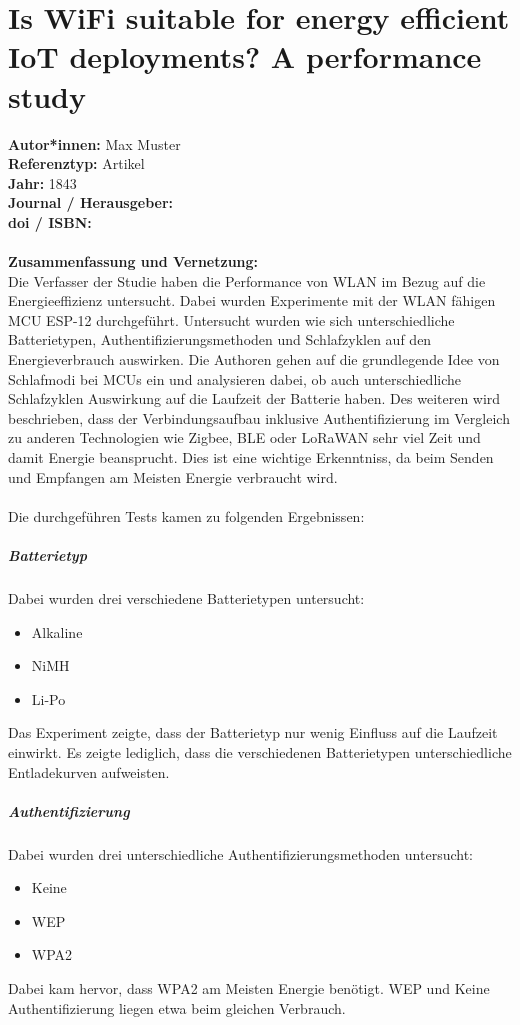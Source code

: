 \documentclass{report}
\begin{document}
{\let\clearpage\relax \chapter{Is WiFi suitable for energy efficient IoT deployments? A performance study}}
\noindent
\textbf{Autor*innen:} Max Muster\\
\textbf{Referenztyp:} Artikel\\
\textbf{Jahr:} 1843\\
\textbf{Journal / Herausgeber:}\\
\textbf{doi / ISBN:}\\\\
\textbf{Zusammenfassung und Vernetzung:}\\
Die Verfasser der Studie haben die Performance von WLAN im Bezug auf die Energieeffizienz untersucht.
Dabei wurden Experimente mit der WLAN fähigen MCU ESP-12 durchgeführt.
Untersucht wurden wie sich unterschiedliche Batterietypen, Authentifizierungsmethoden und Schlafzyklen
auf den Energieverbrauch auswirken. Die Authoren gehen auf die grundlegende Idee von Schlafmodi bei MCUs ein
und analysieren dabei, ob auch unterschiedliche Schlafzyklen Auswirkung auf die Laufzeit der Batterie haben.
Des weiteren wird beschrieben, dass der Verbindungsaufbau inklusive Authentifizierung im Vergleich zu anderen 
Technologien wie Zigbee, BLE oder LoRaWAN sehr viel Zeit und damit Energie beansprucht.
Dies ist eine wichtige Erkenntniss, da beim Senden und Empfangen am Meisten Energie verbraucht wird.
\\
\\
Die durchgeführen Tests kamen zu folgenden Ergebnissen:\\
\paragraph{Batterietyp} Dabei wurden drei verschiedene Batterietypen untersucht:
\begin{itemize}
    \item Alkaline
    \item NiMH
    \item Li-Po
\end{itemize}
Das Experiment zeigte, dass der Batterietyp nur wenig Einfluss auf die Laufzeit einwirkt. Es zeigte lediglich, dass die verschiedenen Batterietypen unterschiedliche Entladekurven aufweisten.

\paragraph{Authentifizierung} Dabei wurden drei unterschiedliche Authentifizierungsmethoden untersucht:
\begin{itemize}
    \item Keine
    \item WEP
    \item WPA2
\end{itemize}
Dabei kam hervor, dass WPA2 am Meisten Energie benötigt. WEP und Keine Authentifizierung liegen etwa beim gleichen Verbrauch.
\end{document}
